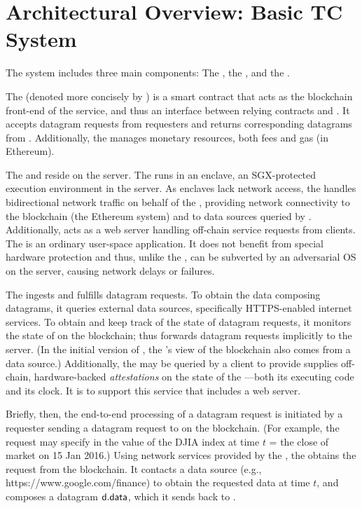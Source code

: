 \section{Architectural Overview: Basic TC System}

The \tcs system includes three main components: The \tcontract, the \encname, and the \medname.

The \tcontract (denoted more concisely by \tcont) is a smart contract that acts as the blockchain front-end of the \tc service, and thus an interface between relying contracts and \tc. It accepts datagram requests from requesters and returns corresponding datagrams from \tc. Additionally, the \tcontract manages \tc monetary resources, both fees and gas (in Ethereum). 

The \encname and \medname reside on the \tc server. The \encname runs in an enclave, an SGX-protected execution environment in the server. As enclaves lack network access, the \medname handles bidirectional network traffic on behalf of the \encname, providing network connectivity to the blockchain (the Ethereum system) and to data sources queried by \encname. Additionally, \medname acts as a web server handling off-chain service requests from clients. The \medname is an ordinary user-space application. It does not benefit from special hardware protection and thus, unlike the \encname, can be subverted by an adversarial OS on the \tc server, causing network delays or failures.

The \encname ingests and fulfills datagram requests. To obtain the data composing datagrams, it queries external data sources, specifically HTTPS-enabled internet services. To obtain and keep track of the state of datagram requests, it monitors the state of \tcontract on the blockchain; thus \tcontract forwards datagram requests implicitly to the \tc server. (In the initial version of \tcontract, the \encname's view of the blockchain also comes from a data source.) Additionally, the \encname may be queried by a client to provide supplies off-chain, hardware-backed \emph{attestations} on the state of the \encname---both its executing code and its clock. It is to support this service that \medname includes a web server.

Briefly, then, the end-to-end processing of a datagram request is initiated by a requester \reqcont sending a datagram request to \tcont on the blockchain. (For example, the request may specify in \dgform the value of the DJIA index at time $t$ = the close of market on 15 Jan 2016.) Using network services provided by the \medname, the \encname obtains the request from the blockchain. It contacts a data source (e.g., https://www.google.com/finance) to obtain the requested data at time $t$, and composes a datagram ${\sf d.data}$, which it sends back to \reqcont.

